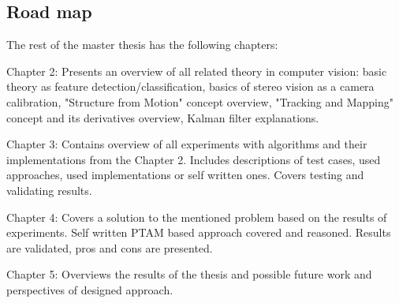 \documentclass[../main]{subfiles}
\begin{document}
\subsection{Road map}

The rest of the master thesis has the following chapters: 

Chapter 2: Presents an overview of all related theory in computer vision: basic theory as feature detection/classification, basics of stereo vision as a camera calibration, "Structure from Motion" concept overview, "Tracking and Mapping" concept and its derivatives overview, Kalman filter explanations.

Chapter 3: Contains overview of all experiments with algorithms and their implementations from the Chapter 2. Includes descriptions of test cases, used approaches, used implementations or self written ones. Covers testing and validating results.

Chapter 4: Covers a solution to the mentioned problem based on the results of experiments. Self written PTAM based approach covered and reasoned. Results are validated, pros and cons are presented.

Chapter 5: Overviews the results of the thesis and possible future work and perspectives of designed approach.
\end{document}
